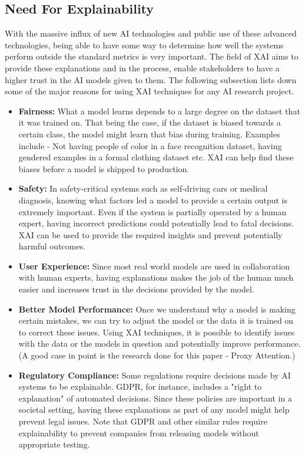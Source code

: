 \subsection{Need For Explainability}
With the massive influx of new AI technologies and public use of these advanced technologies, being able to have some way to determine how well the systems perform outside the standard metrics is very important. The field of XAI aims to provide these explanations and in the process, enable stakeholders to have a higher trust in the AI models given to them. The following subsection lists down some of the major reasons for using XAI techniques for any AI research project.
\begin{itemize}
    \item \textbf{Fairness: } What a model learns depends to a large degree on the dataset that it was trained on. That being the case, if the dataset is biased towards a certain class, the model might learn that bias during training. Examples include - Not having people of color in a face recognition dataset, having gendered examples in a formal clothing dataset etc. XAI can help find these biases before a model is shipped to production.
    \item \textbf{Safety: } In safety-critical systems such as self-driving cars or medical diagnosis, knowing what factors led a model to provide a certain output is extremely important. Even if the system is partially operated by a human expert, having incorrect predictions could potentially lead to fatal decisions. XAI can be used to provide the required insights and prevent potentially harmful outcomes.
    \item \textbf{User Experience: } Since most real world models are used in collaboration with human experts, having explanations makes the job of the human much easier and increases trust in the decisions provided by the model.
    \item \textbf{Better Model Performance: } Once we understand why a model is making certain mistakes, we can try to adjust the model or the data it is trained on to correct these issues. Using XAI techniques, it is possible to identify issues with the data or the models in question and potentially improve performance. (A good case in point is the research done for this paper - Proxy Attention.)
    \item \textbf{Regulatory Compliance: } Some regulations require decisions made by AI systems to be explainable. GDPR, for instance, includes a "right to explanation" of automated decisions. Since these policies are important in a societal setting, having these explanations as part of any model might help prevent legal issues. Note that GDPR and other similar rules require explainability to prevent companies from releasing models without appropriate testing.
    \end{itemize}

